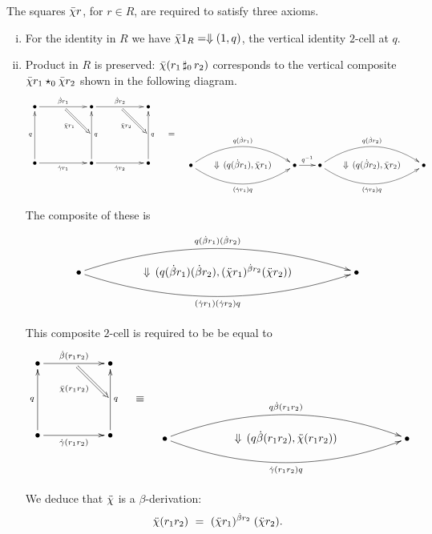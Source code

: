 \medskip\noindent
The squares $\bar{\chi} r$, for $r \in R$, are required to satisfy three axioms.
\begin{enumerate}[(i)]
\item
For the identity in $R$ we have $\bar{\chi} 1_R = \Downarrow(1,q)$, 
the vertical identity $2$-cell at $q$.
\item
Product in $R$ is preserved: $\bar{\chi}(r_1 \,\sharp_0\, r_2)$ corresponds to 
the vertical composite $\bar{\chi} r_1 \star_0 \bar{\chi} r_2$ 
shown in the following diagram.
$$
{\vcenter 
{\xy
\xymatrix{
  \bullet \ar[rr]^{\db r_1} 
    & \ar @{=>} [dr]_{\barch r_1} 
      & \bullet \ar[rr]^{\db r_2} 
        & \ar @{=>} [dr]_{\barch r_2}  
          & \bullet \\
    & & & & \\
  \bullet \ar[uu]^q \ar[rr]_{\dg r_1}  
    & & \bullet \ar[uu]_q \ar[rr]_{\dg r_2}  
        & & \bullet \ar[uu]_q \\
}
\endxy}
\quad=\quad
{\xy
\xymatrix @C=1.5pc{
    & & & & & \\
  \bullet  \ar@/^5ex/[rr]^{q(\db r_1)} 
           \ar@/_5ex/[rr]_{(\dg r_1)q} 
    & \Downarrow\, (q(\db r_1), \ddch r_1)
       & \bullet \ar[r]^{q^{-1}} 
          & \bullet \ar@/^5ex/[rr]^{q(\db r_2)} 
                    \ar@/_5ex/[rr]_{(\dg r_2)q} 
              & \Downarrow\, (q(\db r_2), \ddch r_2) 
                   & \bullet \\
    & & & & & \\
}
\endxy}
}$$
The composite of these is
$$
\xy
\xymatrix @C=1.8pc{
  && && \\
  \bullet  \ar@/^5ex/[rrrr]^{q(\db r_1)(\db r_2)} 
           \ar@/_5ex/[rrrr]_{(\dg r_1)(\dg r_2)q} 
  && \Downarrow\, (q(\db r_1)(\db r_2), (\ddch r_1)^{\db r_2}(\ddch r_2))
      && \bullet \\
  && && \\
}
\endxy
$$
This composite $2$-cell is required to be be equal to
$$
{\vcenter 
{\xy
\xymatrix{
  \bullet \ar[rr]^{\db(r_1r_2)} 
    &  \ar @{=>} [dr]_{\barch(r_1r_2)} 
      & \bullet \\
    & & \\
  \bullet \ar[uu]^q \ar[rr]_{\dg(r_1r_2)} 
    & & \bullet \ar[uu]_q \\
}
\endxy} 
\quad\equiv\quad 
{\xy
\xymatrix{
    && && \\
    \bullet \ar@/^5ex/[rrrr]^{q\db(r_1r_2)} 
            \ar@/_5ex/[rrrr]_{\dg(r_1r_2)q} 
    && \Downarrow\, (q\db(r_1r_2),\ddch(r_1r_2))
       && \bullet \\
    && && \\
}
\endxy}
}$$
We deduce that $\ddot{\chi}$ is a $\beta$-derivation:
$$
\ddot{\chi}(r_1r_2) ~=~ (\ddot{\chi} r_1)^{\dot{\beta} r_2}\;(\ddot{\chi} r_2).
$$


\end{enumerate}
